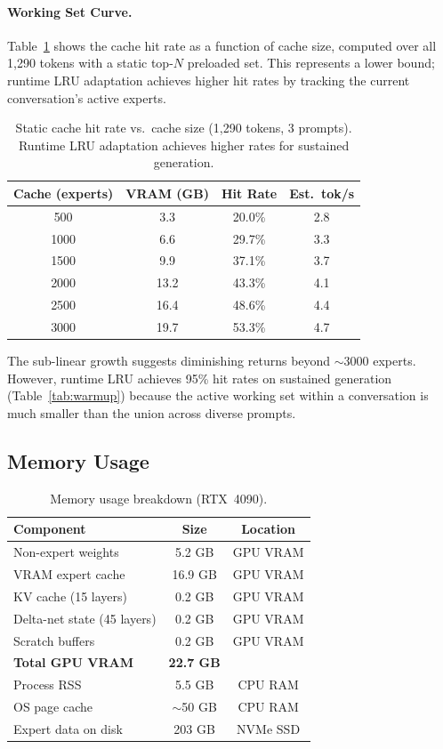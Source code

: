 \documentclass[10pt]{article}
\begin{document}
\paragraph{Working Set Curve.} Table~\ref{tab:workingset} shows the cache hit rate as a function of cache size, computed over all 1,290 tokens with a static top-$N$ preloaded set. This represents a lower bound; runtime LRU adaptation achieves higher hit rates by tracking the current conversation's active experts.

\begin{table}[h]
\centering
\small
\caption{Static cache hit rate vs.\ cache size (1,290 tokens, 3 prompts). Runtime LRU adaptation achieves higher rates for sustained generation.}
\label{tab:workingset}
\begin{tabular}{cccc}
\toprule
\textbf{Cache (experts)} & \textbf{VRAM (GB)} & \textbf{Hit Rate} & \textbf{Est.\ tok/s} \\
\midrule
500 & 3.3 & 20.0\% & 2.8 \\
1000 & 6.6 & 29.7\% & 3.3 \\
1500 & 9.9 & 37.1\% & 3.7 \\
2000 & 13.2 & 43.3\% & 4.1 \\
2500 & 16.4 & 48.6\% & 4.4 \\
3000 & 19.7 & 53.3\% & 4.7 \\
\bottomrule
\end{tabular}
\end{table}

The sub-linear growth suggests diminishing returns beyond $\sim$3000 experts. However, runtime LRU achieves 95\% hit rates on sustained generation (Table~\ref{tab:warmup}) because the active working set within a conversation is much smaller than the union across diverse prompts.

\subsection{Memory Usage}

\begin{table}[h]
\centering
\small
\caption{Memory usage breakdown (RTX~4090).}
\label{tab:memory}
\begin{tabular}{lcc}
\toprule
\textbf{Component} & \textbf{Size} & \textbf{Location} \\
\midrule
Non-expert weights & 5.2 GB & GPU VRAM \\
VRAM expert cache & 16.9 GB & GPU VRAM \\
KV cache (15 layers) & 0.2 GB & GPU VRAM \\
Delta-net state (45 layers) & 0.2 GB & GPU VRAM \\
Scratch buffers & 0.2 GB & GPU VRAM \\
\midrule
\textbf{Total GPU VRAM} & \textbf{22.7 GB} & \\
\midrule
Process RSS & 5.5 GB & CPU RAM \\
OS page cache & $\sim$50 GB & CPU RAM \\
Expert data on disk & 203 GB & NVMe SSD \\
\bottomrule
\end{tabular}
\end{table}
\end{document}
